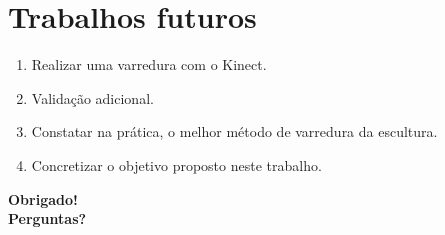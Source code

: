 \documentclass[table, usenames, svgnames, xcolor=dvipsnames]{beamer}
\begin{document}
\section{Trabalhos futuros}

\begin{frame}
	\begin{enumerate}
    	\item {Realizar uma varredura com o Kinect.}
 \item {Validação adicional.} 
\item {Constatar na prática, o melhor método de varredura da escultura.} 
\item {Concretizar o objetivo proposto neste trabalho.}
	\end{enumerate}
\end{frame}

{%
\begin{frame}[plain]
\begin{center}
{\huge \bf Obrigado! \\
Perguntas?}
\end{center}
	
\end{frame}
}
\end{document}
